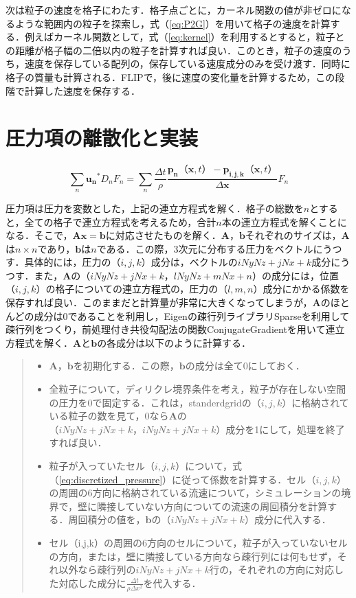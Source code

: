 \documentclass[a4j,12pt]{jreport}
\begin{document}
次は粒子の速度を格子にわたす．格子点ごとに，カーネル関数の値が非ゼロになるような範囲内の粒子を探索し，式（\ref{eq:P2G}）を用いて格子の速度を計算する．例えばカーネル関数として，式（\ref{eq:kernel}）を利用するとすると，粒子との距離が格子幅の二倍以内の粒子を計算すれば良い．このとき，粒子の速度のうち，速度を保存している配列の，保存している速度成分のみを受け渡す．同時に格子の質量も計算される．FLIPで，後に速度の変化量を計算するため，この段階で計算した速度を保存する．

\section{圧力項の離散化と実装} \label{sec:Imppressure}
\begin{equation}
\sum_{n}\bm{u_n}^*D_nF_n= \sum_{n}\frac{\varDelta t}{\rho}\frac{\bm{p_n}（\bm{x},t） - \bm{p_{i,j,k}}（\bm{x},t）}{\varDelta \bm{x}}F_n
\end{equation}

圧力項は圧力を変数とした，上記の連立方程式を解く．格子の総数を$n$とすると，全ての格子で連立方程式を考えるため，合計$n$本の連立方程式を解くことになる．そこで，$\bm{Ax=b}$に対応させたものを解く．$\bm{A}$，$\bm{b}$それぞれのサイズは，$\bm{A}$は$n \times n$であり，$\bm{b}$は$n$である．この際，3次元に分布する圧力をベクトルにうつす．具体的には，圧力の$（i,j,k）$成分は，ベクトルの$iNyNz+jNx+k$成分にうつす．また，$\bm{A}$の$（iNyNz+jNx+k，lNyNz+mNx+n）$の成分には，位置$（i,j,k）$の格子についての連立方程式の，圧力の$（l,m,n）$成分にかかる係数を保存すれば良い．このままだと計算量が非常に大きくなってしまうが，$\bm{A}$のほとんどの成分は$0$であることを利用し，Eigenの疎行列ライブラリSparseを利用して疎行列をつくり，前処理付き共役勾配法の関数ConjugateGradientを用いて連立方程式を解く．$\bm{A}$と$\bm{b}$の各成分は以下のように計算する．
\begin{quote}
	\begin{itemize}
		\item $\bm{A}$，$\bm{b}$を初期化する．この際，$\bm{b}$の成分は全て0にしておく．
		\item 全粒子について，ディリクレ境界条件を考え，粒子が存在しない空間の圧力を$0$で固定する．これは，standerdgridの$（i,j,k）$に格納されている粒子の数を見て，0なら$\bm{A}$の$（iNyNz+jNx+k，iNyNz+jNx+k）$成分を1にして，処理を終了すれば良い．
		\item 粒子が入っていたセル$（i,j,k）$について，式（\ref{eq:discretized_pressure}）に従って係数を計算する．セル$（i,j,k）$の周囲の6方向に格納されている流速について，シミュレーションの境界で，壁に隣接していない方向についての流速の周回積分を計算する．周回積分の値を，$\bm{b}$の$（iNyNz+jNx+k）$成分に代入する．
		\item セル（i,j,k）の周囲の6方向のセルについて，粒子が入っていないセルの方向，または，壁に隣接している方向なら疎行列には何もせず，それ以外なら疎行列の$iNyNz+jNx+k$行の，それぞれの方向に対応した対応した成分に$\frac{\varDelta t}{\rho\varDelta x^2}$を代入する．
	\end{itemize}
\end{quote}
\end{document}

